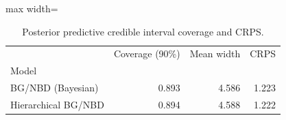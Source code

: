 \begin{table}[htbp]
\centering
\caption{Posterior predictive credible interval coverage and CRPS.}
\label{tab:coverage}
\begin{adjustbox}{max width=\linewidth}
\begin{tabular}{lrrr}
\toprule
 & Coverage (90\%) & Mean width & CRPS \\
Model &  &  &  \\
\midrule
BG/NBD (Bayesian) & 0.893 & 4.586 & 1.223 \\
Hierarchical BG/NBD & 0.894 & 4.588 & 1.222 \\
\bottomrule
\end{tabular}
\end{adjustbox}
\end{table}
